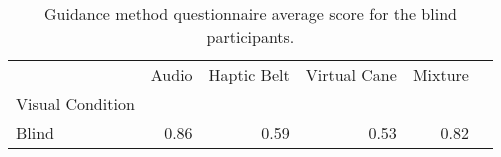 
\begin{table}[!htb]
\centering
\caption{Guidance method questionnaire average score for the blind participants.}
\label{tab:questionnaire_average_group_blind}
\begin{tabular}{lrrrrr}
\toprule
{} & Audio & Haptic Belt & Virtual Cane & Mixture \\
Visual Condition &       &             &              &         \\
\midrule
Blind            &  0.86 &        0.59 &         0.53 &    0.82 \\
\bottomrule
\end{tabular}
\end{table}

